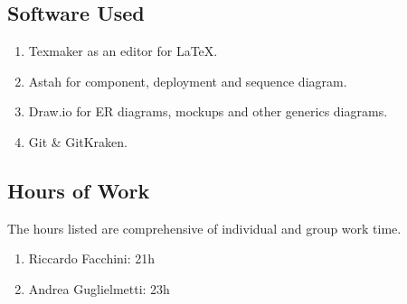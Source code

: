 \subsection{Software Used}
\begin{enumerate}
\item Texmaker as an editor for \LaTeX.
\item Astah for component, deployment and sequence diagram.
\item Draw.io for ER diagrams, mockups and other generics diagrams.
\item Git \& GitKraken.
\end{enumerate}
\subsection{Hours of Work}
The hours listed are comprehensive of individual and group work time.
\begin{enumerate}
\item Riccardo Facchini: 21h
\item Andrea Guglielmetti: 23h
\end{enumerate}